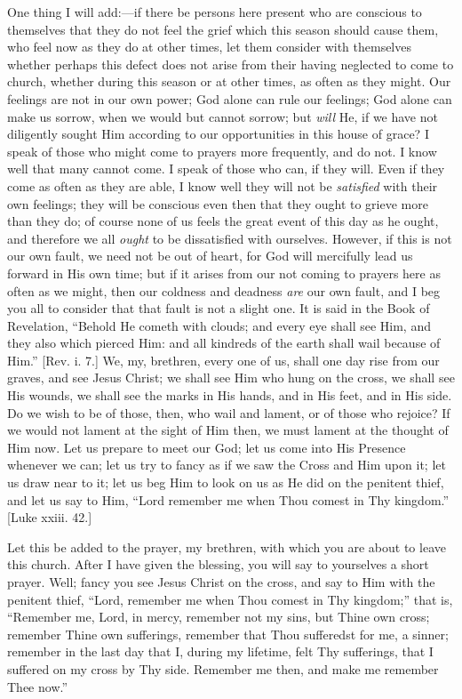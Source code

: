 One thing I will add:—if there be persons here present who are
conscious to themselves that they do not feel the grief which this
season should cause them, who feel now as they do at other times, let
them consider with themselves whether perhaps this defect does not
arise from their having neglected to come to church, whether during
this season or at other times, as often as they might. Our feelings
are not in our own power; God alone can rule our feelings; God alone
can make us sorrow, when we would but cannot sorrow; but \emph{will}
He, if we have not diligently sought Him according to our
opportunities in this house of grace? I speak of those who might come
to prayers more frequently, and do not. I know well that many cannot
come. I speak of those who can, if they will. Even if they come as
often as they are able, I know well they will not be \emph{satisfied}
with their own feelings; they will be conscious even then that they
ought to grieve more than they do; of course none of us feels the
great event of this day as he ought, and therefore we all \emph{ought}
to be dissatisfied with ourselves. However, if this is not our own
fault, we need not be out of heart, for God will mercifully lead us
forward in His own time; but if it arises from our not coming to
prayers here as often as we might, then our coldness and deadness \emph{are}
our own fault, and I beg you all to consider that that fault is not a
slight one. It is said in the Book of Revelation, ``Behold He
cometh with clouds; and every eye shall see Him, and they also which
pierced Him: and all kindreds of the earth shall wail because of
Him.'' [Rev. i. 7.] We, my, brethren, every one of us, shall one
day rise from our graves, and see Jesus Christ; we shall see Him who
hung on the cross, we shall see His wounds, we shall see the marks in
His hands, and in His feet, and in His side. Do we wish to be of
those, then, who wail and lament, or of those who rejoice? If we would
not lament at the sight of Him then, we must lament at the thought of
Him now. Let us prepare to meet our God; let us come into His Presence
whenever we can; let us try to fancy as if we saw the Cross and Him
upon it; let us draw near to it; let us beg Him to look on us as He
did on the penitent thief, and let us say to Him, ``Lord remember
me when Thou comest in Thy kingdom.'' [Luke xxiii. 42.]

Let this be added to the prayer, my brethren, with which you are
about to leave this church. After I have given the blessing, you will
say to yourselves a short prayer. Well; fancy you see Jesus Christ on
the cross, and say to Him with the penitent thief, ``Lord,
remember me when Thou comest in Thy kingdom;'' that is,
``Remember me, Lord, in mercy, remember not my sins, but Thine own
cross; remember Thine own sufferings, remember that Thou sufferedst
for me, a sinner; remember in the last day that I, during my lifetime,
felt Thy sufferings, that I suffered on my cross by Thy side. Remember
me then, and make me remember Thee now.''

